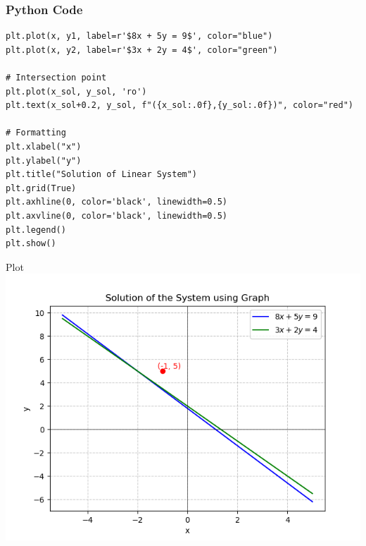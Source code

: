 \documentclass{beamer}
\begin{document}
\begin{frame}[fragile]
    \frametitle{Python Code}
    \begin{lstlisting}
plt.plot(x, y1, label=r'$8x + 5y = 9$', color="blue")
plt.plot(x, y2, label=r'$3x + 2y = 4$', color="green")

# Intersection point
plt.plot(x_sol, y_sol, 'ro')
plt.text(x_sol+0.2, y_sol, f"({x_sol:.0f},{y_sol:.0f})", color="red")

# Formatting
plt.xlabel("x")
plt.ylabel("y")
plt.title("Solution of Linear System")
plt.grid(True)
plt.axhline(0, color='black', linewidth=0.5)
plt.axvline(0, color='black', linewidth=0.5)
plt.legend()
plt.show()
    \end{lstlisting}
\end{frame}

\begin{frame}{Plot}
    \centering
    \includegraphics[width=\columnwidth, height=0.8\textheight, keepaspectratio]{Figs/Fig1.png}     
\end{frame}
\end{document}
